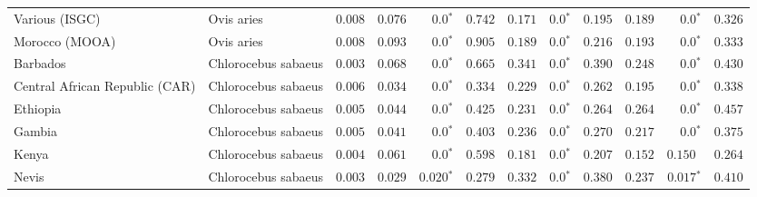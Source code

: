 \documentclass{article}
\begin{document}
\begin{table*}[tb]
\begin{adjustbox}{width = 0.95\textwidth}
\begin{tabular}{||l|l|r||r|r|r||r|r|r||r|r|r||}
                Various (ISGC)                                      & Ovis aries          & $ 0.008$ & $ 0.076$ & $\bm{0.0{^*}}$    & $ 0.742$ & $ 0.171$ & $\bm{0.0{^*}}$ & $ 0.195$ & $ 0.189$ & $\bm{0.0{^*}}$ & $ 0.326$ \\
                Morocco (MOOA)                                      & Ovis aries          & $ 0.008$ & $ 0.093$ & $\bm{0.0{^*}}$    & $ 0.905$ & $ 0.189$ & $\bm{0.0{^*}}$ & $ 0.216$ & $ 0.193$ & $\bm{0.0{^*}}$ & $ 0.333$ \\
                \rowcolor{LIGHTGREY} Barbados                       & Chlorocebus sabaeus & $ 0.003$ & $ 0.068$ & $\bm{0.0{^*}}$                  & $ 0.665$                                                                     & $ 0.341$                      & $\bm{0.0{^*}}$ & $ 0.390$ & $ 0.248$ & $\bm{0.0{^*}}$ & $ 0.430$ \\
                \rowcolor{LIGHTGREY} Central African Republic (CAR) & Chlorocebus sabaeus & $ 0.006$           & $ 0.034$                      & $\bm{0.0{^*}}$ & $ 0.334$ & $ 0.229$ & $\bm{0.0{^*}}$ & $ 0.262$ & $ 0.195$ & $\bm{0.0{^*}}$ & $ 0.338$ \\
                \rowcolor{LIGHTGREY} Ethiopia                       & Chlorocebus sabaeus & $ 0.005$ & $ 0.044$ & $\bm{0.0{^*}}$                  & $ 0.425$                                                                     & $ 0.231$                      & $\bm{0.0{^*}}$ & $ 0.264$ & $ 0.264$ & $\bm{0.0{^*}}$ & $ 0.457$ \\
                \rowcolor{LIGHTGREY} Gambia                         & Chlorocebus sabaeus & $ 0.005$ & $ 0.041$ & $\bm{0.0{^*}}$                  & $ 0.403$                                                                     & $ 0.236$                      & $\bm{0.0{^*}}$ & $ 0.270$ & $ 0.217$ & $\bm{0.0{^*}}$ & $ 0.375$ \\
                \rowcolor{LIGHTGREY} Kenya                          & Chlorocebus sabaeus & $ 0.004$ & $ 0.061$ & $\bm{0.0{^*}}$    & $ 0.598$                                                                     & $ 0.181$                      & $\bm{0.0{^*}}$ & $ 0.207$ & $ 0.152$ & $ 0.150~~$ & $ 0.264$ \\
                \rowcolor{LIGHTGREY} Nevis                          & Chlorocebus sabaeus & $ 0.003$ & $ 0.029$ & $\bm{ 0.020{^*}}$               & $ 0.279$                                                                     & $ 0.332$                      & $\bm{0.0{^*}}$ & $ 0.380$ & $ 0.237$ & $\bm{ 0.017{^*}}$ & $ 0.410$ \\

\end{tabular}
\end{adjustbox}
\end{table*}
\end{document}
